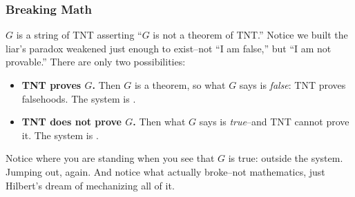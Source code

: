 \documentclass[aspectratio=169]{beamer}
\begin{document}
\begin{frame}[fragile]
  \frametitle{Breaking Math}

  $G$ is a string of TNT asserting ``$G$ is not a theorem of TNT.''
  Notice we built the liar's paradox weakened just enough to
  exist--not ``I am false,'' but ``I am not provable.'' There are only
  two possibilities:

  \pause
  \vspace{\fill}

  \begin{itemize}
    \item \textbf{TNT proves $G$.} Then $G$ is a theorem, so what $G$
      says is \textit{false}: TNT proves falsehoods. The system is
      .
    \item \textbf{TNT does not prove $G$.} Then what $G$ says is
      \textit{true}--and TNT cannot prove it. The system is
      .
  \end{itemize}

  \pause
  \vspace{\fill}


  \pause
  \vspace{\fill}

  Notice where you are standing when you see that $G$ is true:
  outside the system. Jumping out, again. And notice what actually
  broke--not mathematics, just Hilbert's dream of mechanizing all of
  it.
\end{frame}
\end{document}
